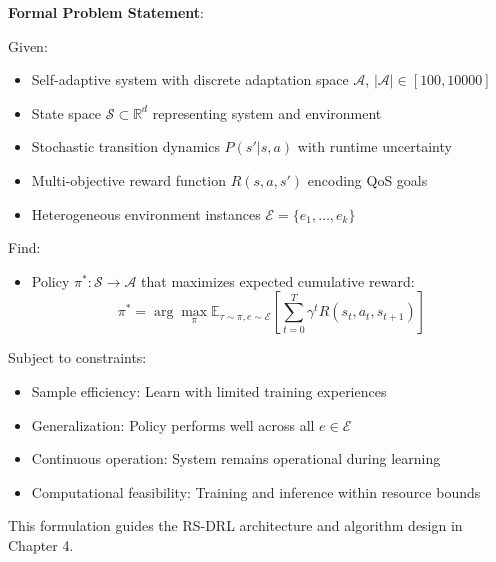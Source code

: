 \documentclass[11pt,a4paper]{article}
\begin{document}
\textbf{Formal Problem Statement}:

Given:
\begin{itemize}
    \item Self-adaptive system with discrete adaptation space $\mathcal{A}$, $|\mathcal{A}| \in [100, 10000]$
    \item State space $\mathcal{S} \subset \mathbb{R}^d$ representing system and environment
    \item Stochastic transition dynamics $P(s'|s,a)$ with runtime uncertainty
    \item Multi-objective reward function $R(s,a,s')$ encoding QoS goals
    \item Heterogeneous environment instances $\mathcal{E} = \{e_1, \ldots, e_k\}$
\end{itemize}

Find:
\begin{itemize}
    \item Policy $\pi^*: \mathcal{S} \rightarrow \mathcal{A}$ that maximizes expected cumulative reward:
    \begin{equation}
    \pi^* = \arg\max_\pi \mathbb{E}_{\tau \sim \pi, e \sim \mathcal{E}} \left[ \sum_{t=0}^T \gamma^t R(s_t, a_t, s_{t+1}) \right]
    \end{equation}
\end{itemize}

Subject to constraints:
\begin{itemize}
    \item Sample efficiency: Learn with limited training experiences
    \item Generalization: Policy performs well across all $e \in \mathcal{E}$
    \item Continuous operation: System remains operational during learning
    \item Computational feasibility: Training and inference within resource bounds
\end{itemize}

This formulation guides the RS-DRL architecture and algorithm design in Chapter 4.

\newpage


\setcounter{section}{0}
\renewcommand{\thesection}{4.\arabic{section}}
\renewcommand{\thesubsection}{4.\arabic{section}.\arabic{subsection}}
\renewcommand{\thesubsubsection}{4.\arabic{section}.\arabic{subsection}.\arabic{subsubsection}}
\end{document}
